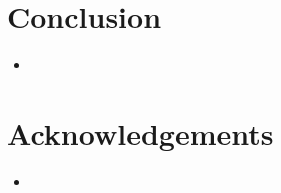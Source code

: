 \documentclass[misc, color=UCLburgundy, margin=2cm]{uclposter}
\begin{document}
\begin{multicols}{4}
\section*{Conclusion}
    \begin{itemize}
        \item \blindtext
    \end{itemize}

\AtNextBibliography{\small}
\printbibliography

\small
\section*{Acknowledgements}
    \begin{itemize}
        \item \blindtext
    \end{itemize}

\end{multicols}
\end{document}
